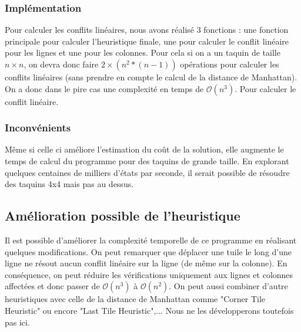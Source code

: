 \documentclass[a4paper, 12pt]{article}
\begin{document}
\subsubsection{Implémentation}

Pour calculer les conflits linéaires, nous avons réalisé 3 fonctions : une fonction principale pour calculer l'heuristique finale, une pour calculer le conflit linéaire pour les lignes et une pour les colonnes. Pour cela si on a un taquin de taille $n \times n$, on devra donc faire $2 \times (n^2*(n-1))$ opérations pour calculer les conflits linéaires (sans prendre en compte le calcul de la distance de Manhattan).
On a donc dans le pire cas une complexité en temps de $ \mathcal{O}(n^3)$. Pour calculer le conflit linéaire.

\subsubsection{Inconvénients}

Même si celle ci améliore l'estimation du coût de la solution, elle augmente le temps de calcul du programme pour des taquins de grande taille. 
En explorant quelques centaines de milliers d'états par seconde, il serait possible de résoudre des taquins 4x4 mais pas au dessus.

\subsection{Amélioration possible de l'heuristique}
Il est possible d'améliorer la complexité temporelle de ce programme en réalisant quelques modifications. On peut remarquer que déplacer une tuile le long d'une ligne ne résout aucun conflit linéaire sur la ligne (de même sur la colonne). En conséquence, on peut réduire les vérifications uniquement aux lignes et colonnes affectées et donc passer de $\mathcal{O}(n^{3})$ à $\mathcal{O}(n^{2})$.
On peut aussi combiner d'autre heuristiques avec celle de la distance de Manhattan comme "Corner Tile Heuristic" ou encore "Last Tile Heuristic",... Nous ne les développerons toutefois pas ici.
\end{document}

